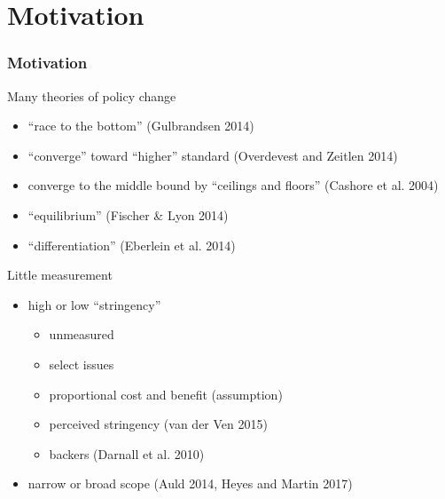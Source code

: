 \documentclass[10pt]{beamer}
\begin{document}
\section{Motivation}

\begin{frame}
\frametitle{Motivation}
Many theories of policy change
\begin{itemize}
\item ``race to the bottom'' (Gulbrandsen 2014)
\item ``converge'' toward ``higher'' standard (Overdevest and Zeitlen 2014)
\item converge to the middle bound by ``ceilings and floors'' (Cashore et al. 2004)
\item ``equilibrium'' (Fischer \& Lyon 2014) 
\item ``differentiation'' (Eberlein et al. 2014)
\end{itemize}\pause
Little measurement \pause
\begin{itemize}
\item high or low ``stringency'' \begin{itemize}
	\item unmeasured
    \item select issues 
    \item proportional cost and benefit (assumption) \pause
    \item perceived stringency (van der Ven 2015)
    \item backers (Darnall et al. 2010)
\end{itemize}
\item narrow or broad scope (Auld 2014, Heyes and Martin 2017)
\end{itemize}
\end{frame}
\end{document}
